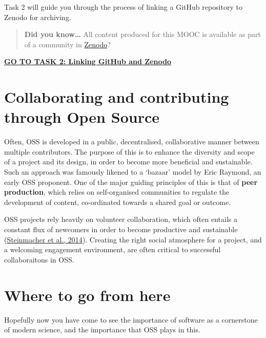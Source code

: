 \documentclass[]{book}
\begin{document}
Task 2 will guide you through the process of linking a GitHub repository to Zenodo for archiving.

\begin{quote}
\textbf{Did you know\ldots{}} All content produced for this MOOC is available as part of a community in \href{https://zenodo.org/communities/open-science-mooc/}{Zenodo}?
\end{quote}

\textbf{\href{https://github.com/OpenScienceMOOC/Module-5-Open-Research-Software-and-Open-Source/blob/master/content_development/Task_2.md}{GO TO TASK 2: Linking GitHub and Zenodo}}

\hypertarget{collaborating-and-contributing-through-open-source}{%
\section{Collaborating and contributing through Open Source }\label{collaborating-and-contributing-through-open-source}}

Often, OSS is developed in a public, decentralised, collaborative manner between multiple contributors. The purpose of this is to enhance the diversity and scope of a project and its design, in order to become more beneficial and sustainable. Such an approach was famously likened to a `bazaar' model by Eric Raymond, an early OSS proponent. One of the major guiding principles of this is that of \textbf{peer production}, which relies on self-organised communities to regulate the development of content, co-ordinated towards a shared goal or outcome.

OSS projects rely heavily on volunteer collaboration, which often entails a constant flux of newcomers in order to become productive and sustainable (\href{https://github.com/OpenScienceMOOC/Module-5-Open-Research-Software-and-Open-Source/blob/master/Reading\%20Material_Open\%20Source\%20and\%20Open\%20Research\%20Software/Steinmacher\%20et\%20al.\%2C\%202014.pdf}{Steinmacher et al., 2014}). Creating the right social atmosphere for a project, and a welcoming engagement environment, are often critical to successful collaboraitons in OSS.

\hypertarget{where-to-go-from-here-1}{%
\section{Where to go from here }\label{where-to-go-from-here-1}}

Hopefully now you have come to see the importance of software as a cornerstone of modern science, and the importance that OSS plays in this.
\end{document}
